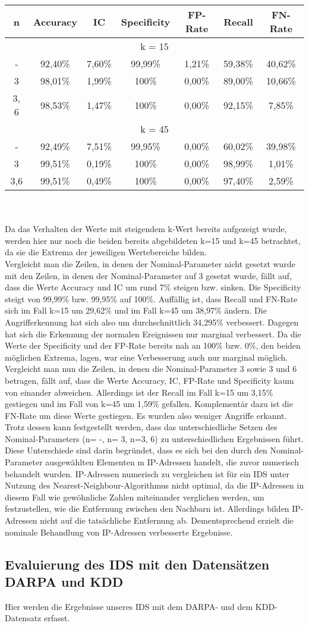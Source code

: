 \documentclass[main.tex]{subfiles}
\begin{document}
\begin{tabular}{|c|c|c|c|c|c|c|}\hline
n & Accuracy & IC & Specificity & FP-Rate & Recall & FN-Rate \\ \hline
 \multicolumn{7}{|c|}{k = 15}\\ \hline
- & 92,40\% & 7,60\% & 99,99\% & 1,21\% & 59,38\% & 40,62\% \\  \hline
3 & 98,01\% & 1,99\% & 100\% & 0,00\% & 89,00\% & 10,66\% \\  \hline
3, 6 & 98,53\% & 1,47\% & 100\% & 0,00\% & 92,15\% &7,85\% \\  \hline
 \multicolumn{7}{|c|}{k = 45}\\ \hline
- & 92,49\% & 7,51\% & 99,95\% & 0,00\% & 60,02\% & 39,98\%\\  \hline
3 & 99,51\% & 0,19\% & 100\% & 0,00\% & 98,99\% & 1,01\%\\  \hline
3,6 &  99,51\% & 0,49\% & 100\% & 0,00\% & 97,40\% & 2,59\%\\  \hline
 \end{tabular} 

\ \\ \\ Da das Verhalten der Werte mit steigendem k-Wert bereits aufgezeigt wurde, werden hier nur noch die beiden bereits abgebildeten k=15 und k=45 betrachtet, da sie die Extrema der jeweiligen Wertebereiche bilden. \\
Vergleicht man die Zeilen, in denen der Nominal-Parameter nicht gesetzt wurde mit den Zeilen, in denen der Nominal-Parameter auf 3 gesetzt wurde, fällt auf, dass die Werte Accuracy und IC um rund 7\% steigen bzw. sinken. Die Specificity steigt von 99,99\% bzw. 99,95\% auf 100\%. Auffällig ist, dass Recall und FN-Rate sich im Fall k=15 um 29,62\% und im Fall k=45 um 38,97\% ändern. Die Angrifferkennung hat sich also um durchschnittlich 34,295\% verbessert. Dagegen hat sich die Erkennung der normalen Ereignissen nur marginal verbessert. Da die Werte der Specificity und der FP-Rate bereits nah an 100\% bzw. 0\%, den beiden möglichen Extrema, lagen, war eine Verbesserung auch nur marginal möglich. \\
Vergleicht man nun die Zeilen, in denen die Nominal-Parameter 3 sowie 3 und 6 betragen, fällt auf, dass die Werte Accuracy, IC, FP-Rate und Specificity kaum von einander abweichen. Allerdings ist der Recall im Fall k=15  um 3,15\% gestiegen und im Fall von k=45 um 1,59\% gefallen. Komplementär dazu ist die FN-Rate um diese Werte gestiegen. Es wurden also weniger Angriffe erkannt. 
Trotz dessen kann festgestellt werden, dass das unterschiedliche Setzen des Nominal-Parameters (n= -, n= 3, n=3, 6) zu unterschiedlichen Ergebnissen führt. Diese Unterschiede sind darin begründet, dass es sich bei den durch den Nominal-Parameter ausgewählten Elementen m IP-Adressen handelt, die zuvor numerisch behandelt wurden. IP-Adressen numerisch zu vergleichen ist für ein IDS unter Nutzung des Nearest-Neighbour-Algorithmus nicht optimal, da die IP-Adressen in diesem Fall wie gewöhnliche Zahlen miteinander verglichen werden, um festzustellen, wie die Entfernung zwischen den Nachbarn ist. Allerdings bilden IP-Adressen nicht auf die tatsächliche Entfernung ab. Dementsprechend erzielt die nominale Behandlung von IP-Adressen verbesserte Ergebnisse.


\subsection{Evaluierung des IDS mit den Datensätzen DARPA und KDD}
Hier werden die Ergebnisse unseres IDS mit dem DARPA- und dem KDD-Datensatz erfasst.
\end{document}
